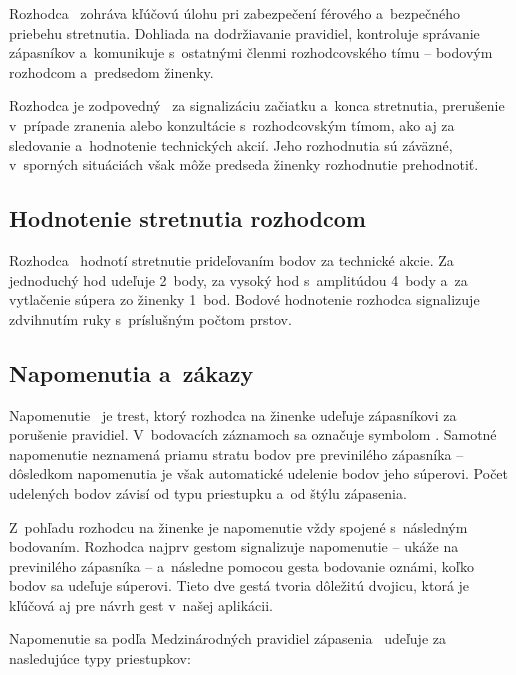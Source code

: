 Rozhodca~\cite{zapasenie_pravidla} zohráva kľúčovú úlohu
pri zabezpečení férového a~bezpečného priebehu stretnutia.
Dohliada na dodržiavanie pravidiel, kontroluje správanie
zápasníkov a~komunikuje s~ostatnými členmi rozhodcovského
tímu -- bodovým rozhodcom a~predsedom žinenky.

Rozhodca je zodpovedný~\cite{zapasenie_pravidla} za
signalizáciu začiatku a~konca stretnutia, prerušenie
v~prípade zranenia alebo konzultácie s~rozhodcovským
tímom, ako aj za sledovanie a~hodnotenie technických
akcií. Jeho rozhodnutia sú záväzné, v~sporných situáciách
však môže predseda žinenky rozhodnutie prehodnotiť.

\subsection{Hodnotenie stretnutia rozhodcom}

Rozhodca~\cite{zapasenie_pravidla} hodnotí stretnutie
prideľovaním bodov za technické akcie. Za jednoduchý
hod udeľuje 2~body, za vysoký hod s~amplitúdou 4~body
a~za vytlačenie súpera zo žinenky 1~bod. Bodové hodnotenie
rozhodca signalizuje zdvihnutím ruky s~príslušným
počtom prstov.

\subsection{Napomenutia a~zákazy}

Napomenutie~\cite[čl.~54]{zapasenie_pravidla} je trest,
ktorý rozhodca na žinenke udeľuje zápasníkovi za
porušenie pravidiel. V~bodovacích záznamoch sa označuje
symbolom . Samotné napomenutie neznamená priamu
stratu bodov pre previnilého zápasníka -- dôsledkom
napomenutia je však automatické udelenie bodov jeho
súperovi. Počet udelených bodov závisí od typu priestupku
a~od štýlu zápasenia.

Z~pohľadu rozhodcu na žinenke je napomenutie vždy spojené
s~následným bodovaním. Rozhodca najprv gestom signalizuje
napomenutie -- ukáže na previnilého zápasníka -- a~následne
pomocou gesta bodovanie oznámi, koľko bodov sa udeľuje
súperovi. Tieto dve gestá tvoria dôležitú dvojicu,
ktorá je kľúčová aj pre návrh gest v~našej aplikácii.

Napomenutie sa podľa Medzinárodných pravidiel
zápasenia~\cite{zapasenie_pravidla} udeľuje za nasledujúce
typy priestupkov:

